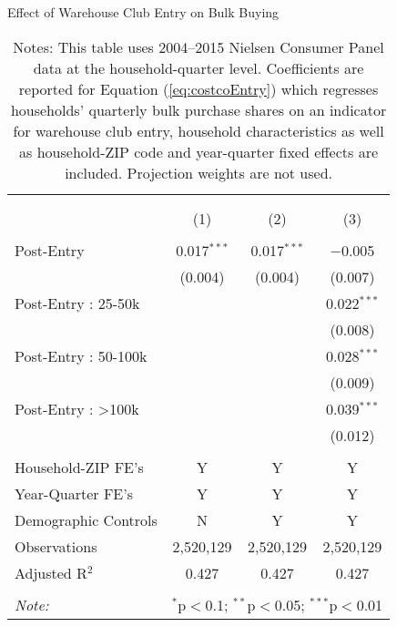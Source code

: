 \begin{table}[!htbp] \centering
  \caption{Effect of Warehouse Club Entry on Bulk Buying}
  \label{tab:costcoEntryDD}
\begin{tabular}{@{\extracolsep{5pt}}lccc}
\\[-1.8ex]\hline
\hline \\[-1.8ex]
\\[-1.8ex] & (1) & (2) & (3)\\
\hline \\[-1.8ex]
 Post-Entry & 0.017$^{***}$ & 0.017$^{***}$ & $-$0.005 \\
  & (0.004) & (0.004) & (0.007) \\
  Post-Entry : 25-50k &  &  & 0.022$^{***}$ \\
  &  &  & (0.008) \\
  Post-Entry : 50-100k &  &  & 0.028$^{***}$ \\
  &  &  & (0.009) \\
  Post-Entry : >100k &  &  & 0.039$^{***}$ \\
  &  &  & (0.012) \\
 \hline \\[-1.8ex]
Household-ZIP FE's & Y & Y & Y \\
Year-Quarter FE's & Y & Y & Y \\
Demographic Controls & N & Y & Y \\
Observations & 2,520,129 & 2,520,129 & 2,520,129 \\
Adjusted R$^{2}$ & 0.427 & 0.427 & 0.427 \\
\hline
\hline \\[-1.8ex]
\textit{Note:}  & \multicolumn{3}{l}{$^{*}$p$<$0.1; $^{**}$p$<$0.05; $^{***}$p$<$0.01} \\
\end{tabular}
\caption*{Notes: This table uses 2004--2015 Nielsen Consumer Panel data at the household-quarter level. Coefficients are reported for Equation (\ref{eq:costcoEntry}) which regresses households' quarterly bulk purchase shares on an indicator for warehouse club entry, household characteristics as well as household-ZIP code and year-quarter fixed effects are included. Projection weights are not used.}
\end{table}
